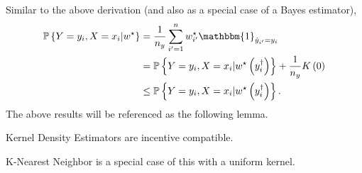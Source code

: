 \documentclass{article}
\begin{document}
Similar to the above derivation (and also as a special case of a Bayes estimator),
\begin{align*}
\mathbb{P}\left\{Y = y_{i}, X = x_{i} | w^\star \right\} &= \dfrac{1}{n_{y}} \displaystyle\sum_{i'=1}^{n} w^\star _{i'} \mathbbm{1}_{\hat{y}_{i'} = y_{i}}
\\ &= \mathbb{P}\left\{Y = y_{i}, X = x_{i} | w^\star \left(y^{\dagger}_{i}\right)\right\} + \dfrac{1}{n_{y}} K\left(0\right)
\\ &\leq  \mathbb{P}\left\{Y = y_{i}, X = x_{i} | w^\star \left(y^{\dagger}_{i}\right)\right\}.
\end{align*}
The above results will be referenced as the following lemma.
\newline \newline
\begin{lem} \label{lem:kde} 
Kernel Density Estimators are incentive compatible.
\newline \newline\end{lem}
K-Nearest Neighbor is a special case of this with a uniform kernel.
\newline \newline
\end{document}
